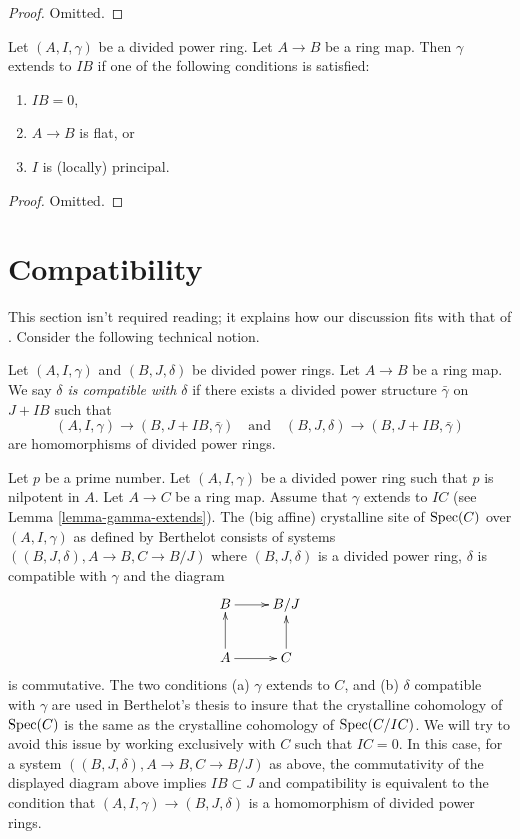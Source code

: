 \begin{proof}
Omitted.
\end{proof}

\begin{lemma}
\label{lemma-gamma-extends}
Let $(A, I, \gamma)$ be a divided power ring.
Let $A \to B$ be a ring map. Then $\gamma$ 
extends to $IB$ if one of the following conditions is satisfied:
\begin{enumerate}
\item $IB = 0$,
\item $A \to B$ is flat, or
\item $I$ is (locally) principal.
\end{enumerate}
\end{lemma}

\begin{proof}
Omitted.
\end{proof}




\section{Compatibility}
\label{section-compatibility}

\noindent
This section isn't required reading; it explains how our discussion
fits with that of \cite{Berthelot}.
Consider the following technical notion.

\begin{definition}
\label{definition-compatible}
Let $(A, I, \gamma)$ and $(B, J, \delta)$ be divided power rings.
Let $A \to B$ be a ring map. We say
{\it $\delta$ is compatible with $\delta$}
if there exists a divided power structure $\bar\gamma$ on
$J + IB$ such that
$$
(A, I, \gamma) \to (B, J + IB, \bar \gamma)\quad\text{and}\quad
(B, J, \delta) \to (B, J + IB, \bar \gamma)
$$
are homomorphisms of divided power rings.
\end{definition}

\noindent
Let $p$ be a prime number. Let $(A, I, \gamma)$ be a divided power ring
such that $p$ is nilpotent in $A$. Let $A \to C$ be a ring
map. Assume that $\gamma$ extends to $IC$ (see
Lemma \ref{lemma-gamma-extends}).
The (big affine) crystalline site of $\mathop{\rm Spec}(C)$ over $(A, I, \gamma)$
as defined by Berthelot consists of systems
$((B, J, \delta), A \to B, C \to B/J)$ where $(B, J, \delta)$ is
a divided power ring, $\delta$ is compatible with $\gamma$ and
the diagram
$$
\xymatrix{
B \ar[r] & B/J \\
A \ar[u] \ar[r] & C \ar[u]
}
$$
is commutative. The two conditions
(a) $\gamma$ extends to $C$, and (b) $\delta$ compatible with $\gamma$
are used in Berthelot's thesis to insure that
the crystalline cohomology of $\mathop{\rm Spec}(C)$ is the same as the crystalline
cohomology of $\mathop{\rm Spec}(C/IC)$. We will try to avoid this issue
by working exclusively with $C$ such that $IC = 0$. In this case,
for a system $((B, J, \delta), A \to B, C \to B/J)$ as above,
the commutativity of the displayed diagram above implies $IB \subset J$ and
compatibility is equivalent to the condition that
$(A, I, \gamma) \to (B, J, \delta)$ is a homomorphism of divided
power rings.


